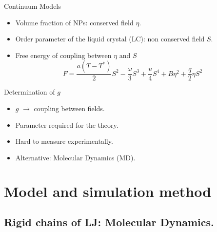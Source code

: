 \documentclass{beamer}
\begin{document}
\begin{frame}{Continuum Models}
    \begin{itemize}
        \item Volume fraction of NPs: conserved field $\eta$.
        \item Order parameter of the liquid crystal (LC): non conserved field $S$.
        \item Free energy of coupling between $\eta$ and $S$
        \begin{equation}
            F = \frac{a(T-T^*)}{2}S^2 - \frac{\omega}{3}S^3 + \frac{u}{4}S^4 + B\eta^2 + \frac{q}{2}\eta S^2
        \end{equation}
    \end{itemize}
\end{frame}

\begin{frame}{Determination of $g$}
    \begin{itemize}
        \item $g$ $\rightarrow$ coupling between fields.
        \item Parameter required for the theory.
        \item Hard to measure experimentally.
        \item Alternative: Molecular Dynamics (MD).
    \end{itemize}
\end{frame}

\section{Model and simulation method}
\subsection{Rigid chains of LJ: Molecular Dynamics.}
\end{document}
